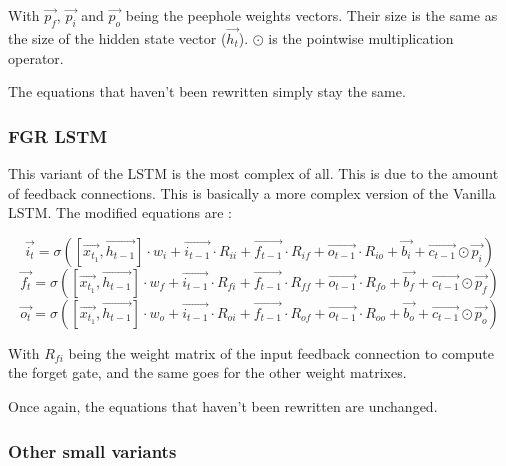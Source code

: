 With $\overrightarrow{p_f}$, $\overrightarrow{p_i}$ and $\overrightarrow{p_o}$ being the peephole weights vectors. Their size is the same as the size of the hidden state vector ($\overrightarrow{h_t}$). $\odot$ is the pointwise multiplication operator.

The equations that haven't been rewritten simply stay the same.

\subsubsection{\acf{FGR} \ac{LSTM}}
This variant of the \ac{LSTM} is the most complex of all. This is due to the amount of feedback connections. This is basically a more complex version of the Vanilla \ac{LSTM}. The modified equations are :

\begin{equation}\label{eq:inputGFGR}
  \overrightarrow{i_t}=\sigma ([\overrightarrow{x_{t_1}},\overrightarrow{h_{t-1}}]\cdot w_i  + \overrightarrow{i_{t-1}}\cdot R_{ii} + \overrightarrow{f_{t-1}}\cdot R_{if} + \overrightarrow{o_{t-1}}\cdot R_{io} + \overrightarrow{b_i} +\overrightarrow{c_{t-1}}\odot \overrightarrow{p_i})
\end{equation}
\begin{equation}\label{eq:forgetGFGR}
  \overrightarrow{f_t}=\sigma ([\overrightarrow{x_{t_1}},\overrightarrow{h_{t-1}}]\cdot w_f  + \overrightarrow{i_{t-1}}\cdot R_{fi} + \overrightarrow{f_{t-1}}\cdot R_{ff} + \overrightarrow{o_{t-1}}\cdot R_{fo} + \overrightarrow{b_f} +\overrightarrow{c_{t-1}}\odot \overrightarrow{p_f})
\end{equation}
\begin{equation}\label{eq:ouputGFGR}
  \overrightarrow{o_t}=\sigma ([\overrightarrow{x_{t_1}},\overrightarrow{h_{t-1}}]\cdot w_o + \overrightarrow{i_{t-1}}\cdot R_{oi} + \overrightarrow{f_{t-1}}\cdot R_{of} + \overrightarrow{o_{t-1}}\cdot R_{oo} + \overrightarrow{b_o} +\overrightarrow{c_{t-1}}\odot \overrightarrow{p_o})
\end{equation}

With $R_{fi}$ being the weight matrix of the input feedback connection to compute the forget gate, and the same goes for the other weight matrixes.

Once again, the equations that haven't been rewritten are unchanged.

\subsubsection{Other small variants}

